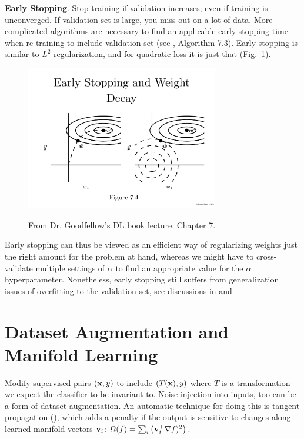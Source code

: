 \documentclass{article}
\begin{document}
\textbf{Early Stopping}. Stop training if validation increases; even if training is unconverged. If validation set is large, you miss out on a lot of data. More complicated algorithms are necessary to find an applicable early stopping time when re-training to include validation set (see , Algorithm 7.3). Early stopping is similar to $L^2$ regularization, and for quadratic loss it is just that (Fig.~\ref{fig:earlystop}).
\begin{figure}[!h]
\centering
{\includegraphics[width=0.75\textwidth]{early-stop.pdf}}
  \caption{From Dr. Goodfellow's DL book lecture, Chapter 7.}
\label{fig:earlystop}
\end{figure}

Early stopping can thus be viewed as an efficient way of regularizing weights just the right amount for the problem at hand, whereas we might have to cross-validate multiple settings of $\alpha$ to find an appropriate value for the $\alpha$ hyperparameter. Nonetheless, early stopping still suffers from generalization issues of overfitting to the validation set, see discussions in  and .

\section{Dataset Augmentation and Manifold Learning}

Modify supervised pairs $(\textbf{x}, y)$ to include $(T(\textbf{x}), y)$ where $T$ is a transformation we expect the classifier to be invariant to. Noise injection into inputs, too can be a form of dataset augmentation. An automatic technique for doing this is tangent propagation (), which adds a penalty if the output is sensitive to changes along learned manifold vectors $\textbf{v}_i$: $\Omega(f)=\sum_i\left({\textbf{v}_i^\top\nabla f)^2}\right)$.
\end{document}

